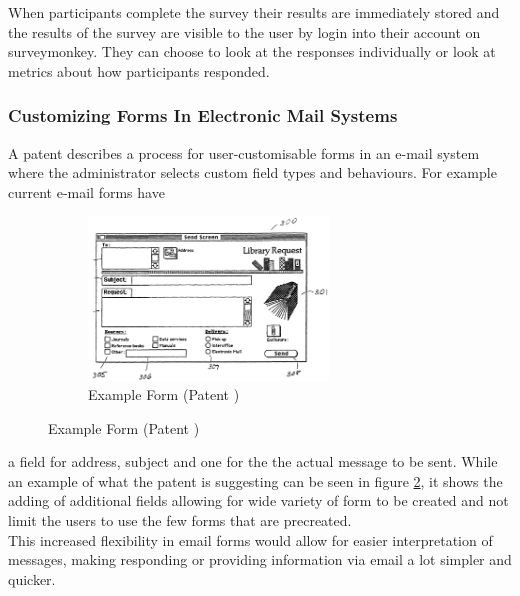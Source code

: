\documentclass[12pt]{article}  %
\begin{document}
When participants complete the survey their results are immediately stored and the results of the survey are visible to the user by login into their account on surveymonkey. They can choose to look at the responses individually or look at metrics about how participants responded.




\subsubsection{Customizing Forms In Electronic Mail Systems}
\noindent
A patent \cite{holt_customizing_2006} describes a process for user-customisable forms in an e-mail system where the administrator selects custom field types and behaviours.  For example current e-mail forms have


\begin{figure}
\vspace*{-\baselineskip}
\begin{figure}[H]
 \includegraphics[width=0.7\textwidth]{images/emailform.png}
	\caption{Example Form (Patent \cite{holt_customizing_2006})}
	\label{fig:emailform}
\end{figure}
\end{figure}


\noindent
a field for address, subject and one for the the actual message to be sent. While an example of what the patent is suggesting can be seen in figure \ref{fig:emailform}, it shows the adding of additional fields allowing for wide variety of form to be created and not limit the  users to use the few forms that are precreated.\\
This increased flexibility in email forms would allow for easier  interpretation of messages, making responding or providing information via email a lot simpler and quicker.
\end{document}
